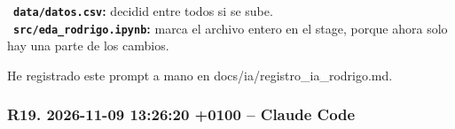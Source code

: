 \documentclass[11pt,a4paper]{article}
\begin{document}
{\hspace*{1.0em}\textbullet~\textbf{\texttt{data/\allowbreak{}datos.csv}:} decidid entre todos si se sube. \\{}
\hspace*{1.0em}\textbullet~\textbf{\texttt{src/\allowbreak{}eda\_\allowbreak{}rodrigo.ipynb}:} marca el archivo entero en el stage, porque ahora solo hay una parte de los cambios.

He registrado este prompt a mano en docs/\allowbreak{}ia/\allowbreak{}registro\_\allowbreak{}ia\_\allowbreak{}rodrigo.md.

}

\subsubsection*{R19. 2026-11-09 13:26:20 +0100 -- Claude Code}
\end{document}
